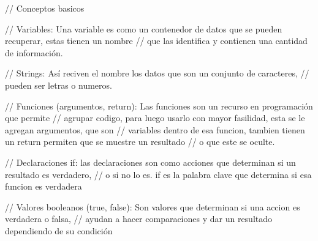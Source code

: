 
// Conceptos basicos

// Variables: Una variable es como un contenedor de datos que se pueden recuperar, estas tienen un nombre 
// que las identifica y contienen una cantidad de información.


// Strings: Así reciven el nombre los datos que son un conjunto de caracteres,
// pueden ser letras o numeros.


// Funciones (argumentos, return): Las funciones son un recurso en programación que permite 
// agrupar codigo, para luego usarlo con mayor fasilidad, esta se le agregan argumentos, que son 
// variables dentro de esa funcion, tambien tienen un return permiten que se muestre un resultado
// o que este se oculte.


// Declaraciones if: las declaraciones son como acciones que determinan si un resultado es verdadero, 
// o si no lo es. if es la palabra clave que determina si esa funcion es verdadera


// Valores booleanos (true, false): Son valores que determinan si una accion es verdadera o falsa, 
// ayudan a hacer comparaciones y dar un resultado dependiendo de su condición



